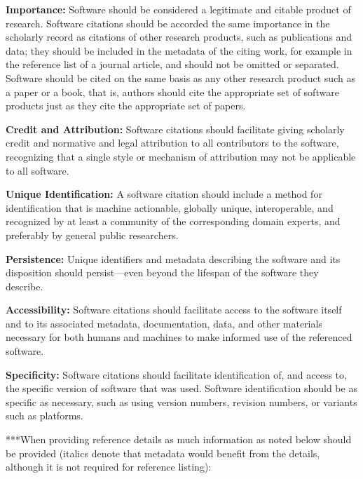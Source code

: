 \documentclass[10pt]{article}
\begin{document}
\begin{guidenumbers}
  \item \textbf{Importance:} Software should be considered a legitimate and citable product of research. Software citations should be accorded the same importance in the scholarly record as citations of other research products, such as publications and data; they should be included in the metadata of the citing work, for example in the reference list of a journal article, and should not be omitted or separated. Software should be cited on the same basis as any other research product such as a paper or a book, that is, authors should cite the appropriate set of software products just as they cite the appropriate set of papers.
  \item \textbf{Credit and Attribution:} Software citations should facilitate giving scholarly credit and normative and legal attribution to all contributors to the software, recognizing that a single style or mechanism of attribution may not be applicable to all software.
  \item \textbf{Unique Identification:} A software citation should include a method for identification that is machine actionable, globally unique, interoperable, and recognized by at least a community of the corresponding domain experts, and preferably by general public researchers.
  \item \textbf{Persistence:} Unique identifiers and metadata describing the software and its disposition should persist—even beyond the lifespan of the software they describe.
  \item \textbf{Accessibility:} Software citations should facilitate access to the software itself and to its associated metadata, documentation, data, and other materials necessary for both humans and machines to make informed use of the referenced software.
  \item \textbf{Specificity:} Software citations should facilitate identification of, and access to, the specific version of software that was used. Software identification should be as specific as necessary, such as using version numbers, revision numbers, or variants such as platforms.
\end{guidenumbers}

***When providing reference details as much information as noted below should be provided (italics denote that metadata would benefit from the details, although it is not required for reference listing):
\end{document}
